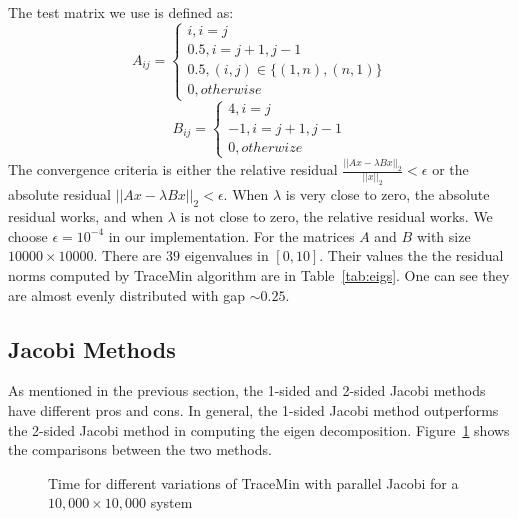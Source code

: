 \label{sec:results}
The test matrix we use is defined as:
\[
A_{ij} =
\begin{cases}
i, i =j \\
0.5, i = j+1, j-1 \\
0.5, (i, j) \in \{(1, n), (n,1)\} \\
0, otherwise
\end{cases}
\]
\[
B_{ij} = 
\begin{cases}
4, i = j \\
-1, i = j+1, j-1 \\
0, otherwize
\end{cases}
\]
The convergence criteria is either the relative residual $\frac{||Ax-\lambda B x||_2}{||x||_2} < \epsilon$ or the absolute residual $||Ax-\lambda B x||_2 < \epsilon$. When $\lambda$ is very close to zero, the absolute residual works, and when $\lambda$ is not close to zero, the relative residual works. We choose $\epsilon = 10^{-4}$ in our implementation. For the matrices $A$ and $B$ with size $10000 \times 10000$. There are $39$ eigenvalues in $[0, 10]$. Their values the the residual norms computed by TraceMin algorithm are in Table~\ref{tab:eigs}. One can see they are almost evenly distributed with gap $\sim 0.25$. 

\subsection{Jacobi Methods}
As mentioned in the previous section, the 1-sided and 2-sided Jacobi methods have different pros and cons. In general,
the 1-sided Jacobi method outperforms the 2-sided Jacobi method in computing the eigen decomposition.
Figure~\ref{fig:jacobi} shows the comparisons between the two methods.

\begin{figure}[htbp]
	\centering
	\caption{Time for different variations of TraceMin with parallel Jacobi for a $10,000 \times 10,000$ system}
  \label{fig:jacobi}
\end{figure}

